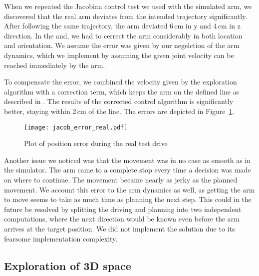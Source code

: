 \documentclass[buriama8_dp.tex]{subfiles}
\begin{document}
When we repeated the Jacobian control test we used with the simulated arm, we discovered that the real arm deviates from the intended trajectory significantly. After following the same trajectory, the arm deviated 6\,cm in \m y and 4\,cm in \m z direction. In the and, we had to cerrect the arm considerably in both location and orientation. We assume the error was given by our negelction of the arm dynamics, which we implement by assuming the given joint velocity can be reached immediately by the arm.

To compensate the error, we combined the velocity given by the exploration algorithm with a correction term, which keeps the arm on the defined line as described in . The results of the corrected control algorithm is significantly better, staying within 2\,cm of the line. The errors are depicted in Figure~\ref{fig:err_jac_real}.

\begin{figure}[ht]
  \centering
  \texttt{[image: jacob\_error\_real.pdf]}
  \caption{Plot of position error during the real test drive}
  \label{fig:err_jac_real}
\end{figure}

Another issue we noticed was that the movement was in no case as smooth as in the simulator. The arm came to a complete stop every time a decision was made on where to continue. The movement became nearly as jerky as the planned movement. We account this error to the arm dynamics as well, as getting the arm to move seems to take as much time as planning the next step. This could in the future be resolved by splitting the driving and planning into two independent computations, where the next direction would be known even before the arm arrives at the target position. We did not implement the solution due to its fearsome implementation complexity.

\subsection{Exploration of 3D space}
\label{subsec:label}
\end{document}
